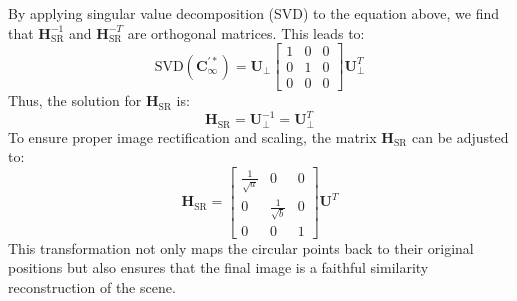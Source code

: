 By applying singular value decomposition (SVD) to the equation above, we find that $\mathbf{H}_\text{SR}^{-1}$ and $\mathbf{H}_\text{SR}^{-T}$ are orthogonal matrices. 
This leads to: 
\[\text{SVD}\left(\mathbf{C}_{\infty}^{\prime\ast}\right)=\mathbf{U}_\perp \begin{bmatrix} 1 & 0 & 0 \\ 0 & 1 & 0 \\ 0 & 0 & 0 \end{bmatrix} \mathbf{U}_{\perp}^T\]
Thus, the solution for $\mathbf{H}_\text{SR}$ is:
\[\mathbf{H}_\text{SR} = \mathbf{U}_{\perp}^{-1}=\mathbf{U}_{\perp}^T\]
To ensure proper image rectification and scaling, the matrix $\mathbf{H}_\text{SR}$ can be adjusted to:
\[\mathbf{H}_\text{SR} = \begin{bmatrix} \frac{1}{\sqrt{a}} & 0 & 0 \\ 0 & \frac{1}{\sqrt{b}} & 0 \\ 0 & 0 & 1 \end{bmatrix} \mathbf{U}^T\]
This transformation not only maps the circular points back to their original positions but also ensures that the final image is a faithful similarity reconstruction of the scene.


